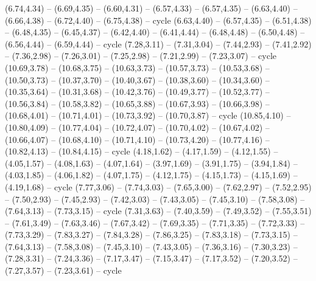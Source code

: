 \expandafter\def\csname geo:gebiet:SVK\endcsname{
  (6.74,4.34) -- (6.69,4.35) -- (6.60,4.31) -- (6.57,4.33) -- (6.57,4.35) -- (6.63,4.40) -- (6.66,4.38) -- (6.72,4.40) -- (6.75,4.38) -- cycle}
\expandafter\def\csname geo:gebiet:CZE\endcsname{
  (6.63,4.40) -- (6.57,4.35) -- (6.51,4.38) -- (6.48,4.35) -- (6.45,4.37) -- (6.42,4.40) -- (6.41,4.44) -- (6.48,4.48) -- (6.50,4.48) -- (6.56,4.44) -- (6.59,4.44) -- cycle}
\expandafter\def\csname geo:gebiet:ERI\endcsname{
  (7.28,3.11) -- (7.31,3.04) -- (7.44,2.93) -- (7.41,2.92) -- (7.36,2.98) -- (7.26,3.01) -- (7.25,2.98) -- (7.21,2.99) -- (7.23,3.07) -- cycle}
\expandafter\def\csname geo:gebiet:JPN\endcsname{
  (10.69,3.78) -- (10.68,3.75) -- (10.63,3.73) -- (10.57,3.73) -- (10.53,3.68) -- (10.50,3.73) -- (10.37,3.70) -- (10.40,3.67) -- (10.38,3.60) -- (10.34,3.60) -- (10.35,3.64) -- (10.31,3.68) -- (10.42,3.76) -- (10.49,3.77) -- (10.52,3.77) -- (10.56,3.84) -- (10.58,3.82) -- (10.65,3.88) -- (10.67,3.93) -- (10.66,3.98) -- (10.68,4.01) -- (10.71,4.01) -- (10.73,3.92) -- (10.70,3.87) -- cycle
  (10.85,4.10) -- (10.80,4.09) -- (10.77,4.04) -- (10.72,4.07) -- (10.70,4.02) -- (10.67,4.02) -- (10.66,4.07) -- (10.68,4.10) -- (10.71,4.10) -- (10.73,4.20) -- (10.77,4.16) -- (10.82,4.13) -- (10.84,4.15) -- cycle}
\expandafter\def\csname geo:gebiet:PRY\endcsname{
  (4.18,1.62) -- (4.17,1.59) -- (4.12,1.55) -- (4.05,1.57) -- (4.08,1.63) -- (4.07,1.64) -- (3.97,1.69) -- (3.91,1.75) -- (3.94,1.84) -- (4.03,1.85) -- (4.06,1.82) -- (4.07,1.75) -- (4.12,1.75) -- (4.15,1.73) -- (4.15,1.69) -- (4.19,1.68) -- cycle}
\expandafter\def\csname geo:gebiet:YEM\endcsname{
  (7.77,3.06) -- (7.74,3.03) -- (7.65,3.00) -- (7.62,2.97) -- (7.52,2.95) -- (7.50,2.93) -- (7.45,2.93) -- (7.42,3.03) -- (7.43,3.05) -- (7.45,3.10) -- (7.58,3.08) -- (7.64,3.13) -- (7.73,3.15) -- cycle}
\expandafter\def\csname geo:gebiet:SAU\endcsname{
  (7.31,3.63) -- (7.40,3.59) -- (7.49,3.52) -- (7.55,3.51) -- (7.61,3.49) -- (7.63,3.46) -- (7.67,3.42) -- (7.69,3.35) -- (7.71,3.35) -- (7.72,3.33) -- (7.73,3.29) -- (7.83,3.27) -- (7.84,3.28) -- (7.86,3.25) -- (7.83,3.18) -- (7.73,3.15) -- (7.64,3.13) -- (7.58,3.08) -- (7.45,3.10) -- (7.43,3.05) -- (7.36,3.16) -- (7.30,3.23) -- (7.28,3.31) -- (7.24,3.36) -- (7.17,3.47) -- (7.15,3.47) -- (7.17,3.52) -- (7.20,3.52) -- (7.27,3.57) -- (7.23,3.61) -- cycle}
\expandafter\def\csname geo:gebiet:CYN\endcsname{
  }
\expandafter\def\csname geo:gebiet:CYP\endcsname{
  }

